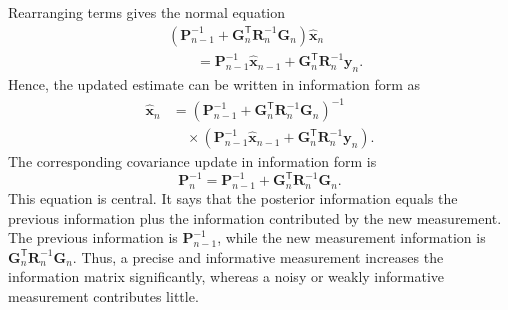 Rearranging terms gives the normal equation
\begin{align*}
&\left(\mathbf{P}_{n-1}^{-1}+\mathbf{G}_n^{\mathsf T}\mathbf{R}_n^{-1}\mathbf{G}_n\right)\widehat{\mathbf{x}}_n\\
&\qquad=
\mathbf{P}_{n-1}^{-1}\widehat{\mathbf{x}}_{n-1}
+\mathbf{G}_n^{\mathsf T}\mathbf{R}_n^{-1}\mathbf{y}_n.
\end{align*}
Hence, the updated estimate can be written in information form as
\begin{equation}
\begin{aligned}
\widehat{\mathbf{x}}_n
&=
\left(
\mathbf{P}_{n-1}^{-1}
+
\mathbf{G}_n^{\mathsf T}
\mathbf{R}_n^{-1}
\mathbf{G}_n
\right)^{-1}\\
&\quad{}\times
\left(
\mathbf{P}_{n-1}^{-1}
\widehat{\mathbf{x}}_{n-1}
+
\mathbf{G}_n^{\mathsf T}
\mathbf{R}_n^{-1}
\mathbf{y}_n
\right).
\end{aligned}
\end{equation}
The corresponding covariance update in information form is
\begin{equation}
\mathbf{P}_n^{-1}
=
\mathbf{P}_{n-1}^{-1}
+
\mathbf{G}_n^{\mathsf T}
\mathbf{R}_n^{-1}
\mathbf{G}_n.
\end{equation}
This equation is central. It says that the posterior information equals the previous information plus the information contributed by the new measurement. The previous information is $\mathbf{P}_{n-1}^{-1}$, while the new measurement information is $\mathbf{G}_n^{\mathsf T}\mathbf{R}_n^{-1}\mathbf{G}_n$. Thus, a precise and informative measurement increases the information matrix significantly, whereas a noisy or weakly informative measurement contributes little.

